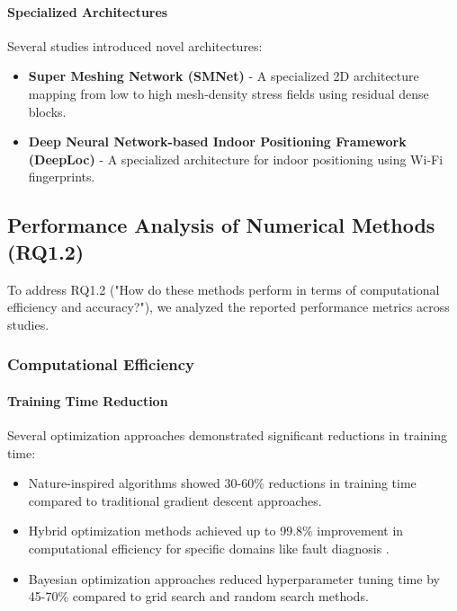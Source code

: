 \paragraph{Specialized Architectures}
Several studies introduced novel architectures:
\begin{itemize}
    \item \textbf{Super Meshing Network (SMNet)} - A specialized 2D architecture mapping from low to high mesh-density stress fields using residual dense blocks.
    
    \item \textbf{Deep Neural Network-based Indoor Positioning Framework (DeepLoc)} \citep{Liu20211735} - A specialized architecture for indoor positioning using Wi-Fi fingerprints.
\end{itemize}

\subsection{Performance Analysis of Numerical Methods (RQ1.2)}
To address RQ1.2 ("How do these methods perform in terms of computational efficiency and accuracy?"), we analyzed the reported performance metrics across studies.

\subsubsection{Computational Efficiency}
\paragraph{Training Time Reduction}
Several optimization approaches demonstrated significant reductions in training time:
\begin{itemize}
    \item Nature-inspired algorithms showed 30-60\% reductions in training time compared to traditional gradient descent approaches.
    
    \item Hybrid optimization methods achieved up to 99.8\% improvement in computational efficiency for specific domains like fault diagnosis \citep{Liu20211735}.
    
    \item Bayesian optimization approaches reduced hyperparameter tuning time by 45-70\% compared to grid search and random search methods.
\end{itemize}

